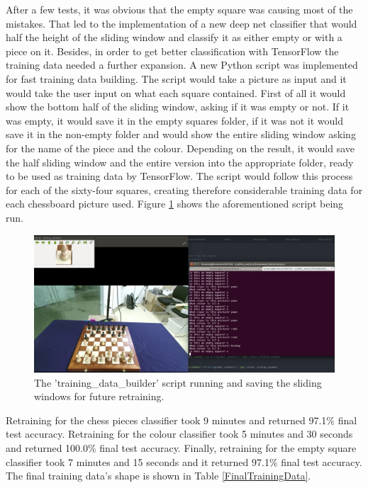 \documentclass{l4proj}
\begin{document}
After a few tests, it was obvious that the empty square was causing most of the mistakes. That led to the implementation of a new deep net classifier that would half the height of the sliding window and classify it as either empty or with a piece on it. Besides, in order to get better classification with TensorFlow the training data needed a further expansion. A new Python script was implemented for fast training data building. The script would take a picture as input and it would take the user input on what each square contained. First of all it would show the bottom half of the sliding window, asking if it was empty or not. If it was empty, it would save it in the empty squares folder, if it was not it would save it in the non-empty folder and would show the entire sliding window asking for the name of the piece and the colour. Depending on the result, it would save the half sliding window and the entire version into the appropriate folder, ready to be used as training data by TensorFlow. The script would follow this process for each of the sixty-four squares, creating therefore considerable training data for each chessboard picture used. Figure \ref{TrainingDataBuilder} shows the aforementioned script being run.

\begin{figure}[h!]
\centering
\includegraphics[scale=0.28]{training_data_builder.png}
\caption{The 'training\_data\_builder' script running and saving the sliding windows for future retraining.}
\label{TrainingDataBuilder}
\end{figure}

\vspace{10mm}
Retraining for the chess pieces classifier took 9 minutes and returned 97.1\% final test accuracy. Retraining for the colour classifier took 5 minutes and 30 seconds and returned 100.0\% final test accuracy. Finally, retraining for the empty square classifier took 7 minutes and 15 seconds and it returned 97.1\% final test accuracy. The final training data's shape is shown in Table \ref{FinalTrainingData}.
\end{document}
